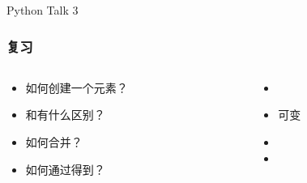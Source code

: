 



\PreFirstFrame
\begin{frame} [fragile]
	\centerline{\fontsize{42}{42}\selectfont Python Talk 3}
\end{frame}
\PostFirstFrame

\begin{frame} [fragile]
	\frametitle{复习}
	\linespread{1.5}
	\begin{columns}[T]
		\begin{column}[T]{.7\textwidth}
			\begin{itemize}
			\item 如何创建一个元素？
			\item {}和有什么区别？
			\item 如何合并？
			\item 如何通过得到？
			\end{itemize}
		\end{column}
		\begin{column}[T]{.3\textwidth}
			\begin{itemize}
			\item {}
			\item {}可变
			\item {}
			\item \inlinePython{[1: 8: 2]}
			\end{itemize}
		\end{column}
	\end{columns}
\end{frame}

